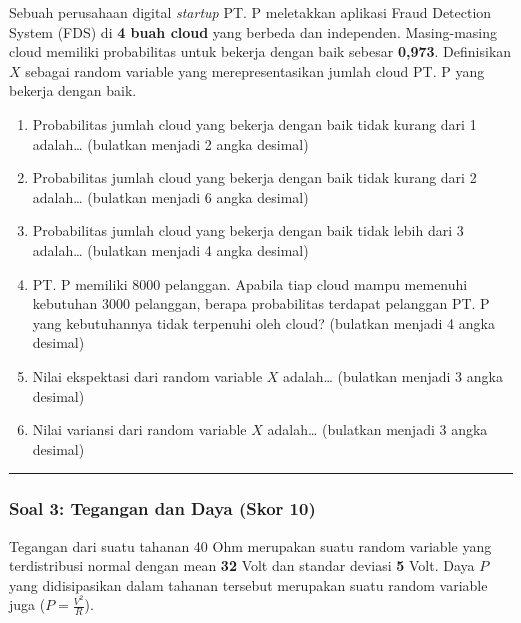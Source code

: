 \documentclass[
  letterpaper,
  DIV=11,
  numbers=noendperiod]{scrartcl}
\providecommand{\tightlist}{%
  \setlength{\itemsep}{0pt}\setlength{\parskip}{0pt}}
\begin{document}
Sebuah perusahaan digital \emph{startup} PT. P meletakkan aplikasi Fraud
Detection System (FDS) di \textbf{4 buah cloud} yang berbeda dan
independen. Masing-masing cloud memiliki probabilitas untuk bekerja
dengan baik sebesar \textbf{0,973}. Definisikan \(X\) sebagai random
variable yang merepresentasikan jumlah cloud PT. P yang bekerja dengan
baik.

\begin{enumerate}
\def\labelenumi{\alph{enumi}.}
\tightlist
\item
  Probabilitas jumlah cloud yang bekerja dengan baik tidak kurang dari 1
  adalah\ldots{} (bulatkan menjadi 2 angka desimal)
\item
  Probabilitas jumlah cloud yang bekerja dengan baik tidak kurang dari 2
  adalah\ldots{} (bulatkan menjadi 6 angka desimal)
\item
  Probabilitas jumlah cloud yang bekerja dengan baik tidak lebih dari 3
  adalah\ldots{} (bulatkan menjadi 4 angka desimal)
\item
  PT. P memiliki 8000 pelanggan. Apabila tiap cloud mampu memenuhi
  kebutuhan 3000 pelanggan, berapa probabilitas terdapat pelanggan PT. P
  yang kebutuhannya tidak terpenuhi oleh cloud? (bulatkan menjadi 4
  angka desimal)
\item
  Nilai ekspektasi dari random variable \(X\) adalah\ldots{} (bulatkan
  menjadi 3 angka desimal)
\item
  Nilai variansi dari random variable \(X\) adalah\ldots{} (bulatkan
  menjadi 3 angka desimal)
\end{enumerate}

\begin{center}\rule{0.5\linewidth}{0.5pt}\end{center}

\subsubsection{\texorpdfstring{\textbf{Soal 3: Tegangan dan Daya (Skor
10)}}{Soal 3: Tegangan dan Daya (Skor 10)}}\label{soal-3-tegangan-dan-daya-skor-10}

Tegangan dari suatu tahanan 40 Ohm merupakan suatu random variable yang
terdistribusi normal dengan mean \textbf{32} Volt dan standar deviasi
\textbf{5} Volt. Daya \(P\) yang didisipasikan dalam tahanan tersebut
merupakan suatu random variable juga (\(P = \frac{V^2}{R}\)).
\end{document}
